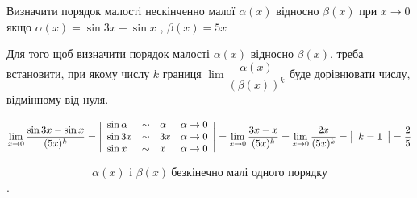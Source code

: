 {}

Визначити порядок малості нескінченно малої $\alpha{(x)}$ відносно $\beta{(x)}$ при $x\to0$ якщо $\alpha{(x)} = \sin3x - \sin{x}$ ,  $\beta{(x)} = 5x$

Для того щоб визначити порядок малості $\alpha{(x)}$ відносно $\beta{(x)}$, треба
встановити, при якому числу $k$ границя $\lim \dfrac{\alpha{(x)}}{(\beta{(x)})^k}$ буде дорівнювати числу, відмінному від нуля.

$$
 \lim_{x\to0} \dfrac{\sin3x-\sin{x}}{(5x)^k} =
 \Bigg |
    \begin{array}{lcl l}
      \sin {\alpha} & \sim & \alpha & \alpha \to 0 \\
      \sin 3x & \sim & 3x & \alpha \to 0 \\
      \sin x & \sim & x & \alpha \to 0 \\
    \end{array}
 \Bigg | =
 \lim_{x\to0} \dfrac{3x-x}{(5x)^k} = \lim_{x\to0} \dfrac{2x}{(5x)^k} =
 \big |
  \begin{array}{l}
    k=1
  \end{array}
 \big | = \dfrac{2}{5}
$$

$$\alpha{(x)} {\text{ \ і \ }} \beta{(x)} \ {\text{безкінечно малі одного порядку}}$$.
